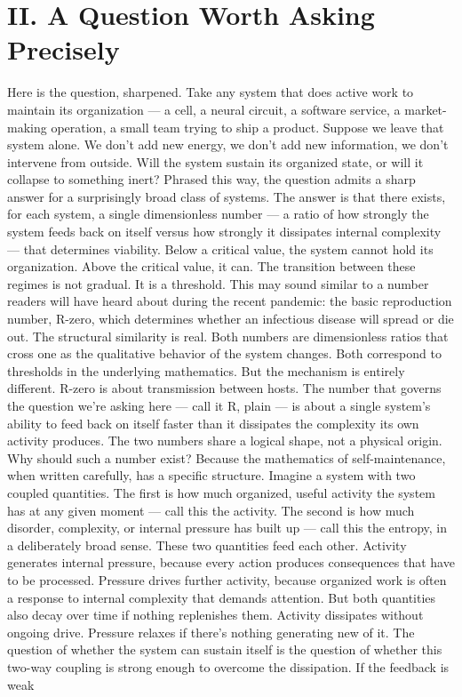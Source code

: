 \documentclass[12pt]{article}
\begin{document}
\section*{II. A Question Worth Asking Precisely}

Here is the question, sharpened. Take any system that does active work to maintain its organization --- a cell, a neural circuit, a software service, a market-making operation, a small team trying to ship a product. Suppose we leave that system alone. We don't add new energy, we don't add new information, we don't intervene from outside. Will the system sustain its organized state, or will it collapse to something inert? Phrased this way, the question admits a sharp answer for a surprisingly broad class of systems. The answer is that there exists, for each system, a single dimensionless number --- a ratio of how strongly the system feeds back on itself versus how strongly it dissipates internal complexity --- that determines viability. Below a critical value, the system cannot hold its organization. Above the critical value, it can. The transition between these regimes is not gradual. It is a threshold. This may sound similar to a number readers will have heard about during the recent pandemic: the basic reproduction number, R-zero, which determines whether an infectious disease will spread or die out. The structural similarity is real. Both numbers are dimensionless ratios that cross one as the qualitative behavior of the system changes. Both correspond to thresholds in the underlying mathematics. But the mechanism is entirely different. R-zero is about transmission between hosts. The number that governs the question we're asking here --- call it R, plain --- is about a single system's ability to feed back on itself faster than it dissipates the complexity its own activity produces. The two numbers share a logical shape, not a physical origin. Why should such a number exist? Because the mathematics of self-maintenance, when written carefully, has a specific structure. Imagine a system with two coupled quantities. The first is how much organized, useful activity the system has at any given moment --- call this the activity. The second is how much disorder, complexity, or internal pressure has built up --- call this the entropy, in a deliberately broad sense. These two quantities feed each other. Activity generates internal pressure, because every action produces consequences that have to be processed. Pressure drives further activity, because organized work is often a response to internal complexity that demands attention. But both quantities also decay over time if nothing replenishes them. Activity dissipates without ongoing drive. Pressure relaxes if there's nothing generating new of it. The question of whether the system can sustain itself is the question of whether this two-way coupling is strong enough to overcome the dissipation. If the feedback is weak
\end{document}

